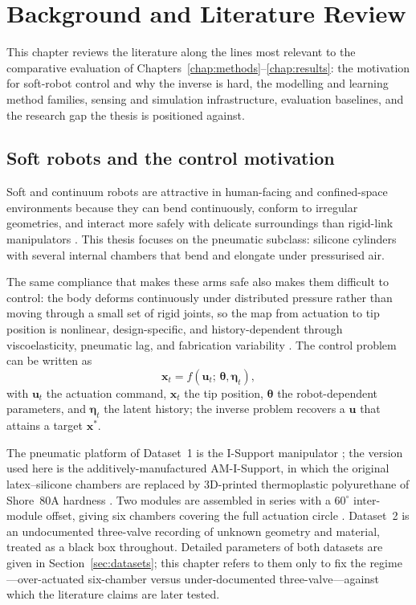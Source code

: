 \chapter{Background and Literature Review}
\label{chap:background}

This chapter reviews the literature along the lines most relevant to the comparative evaluation of Chapters~\ref{chap:methods}--\ref{chap:results}: the motivation for soft-robot control and why the inverse is hard, the modelling and learning method families, sensing and simulation infrastructure, evaluation baselines, and the research gap the thesis is positioned against.

\section{Soft robots and the control motivation}
\label{sec:bg_motivation}

Soft and continuum robots are attractive in human-facing and confined-space environments because they can bend continuously, conform to irregular geometries, and interact more safely with delicate surroundings than rigid-link manipulators \cite{rus2015softrobots, burgnerkahrs2015medical, dupont2022medical}. This thesis focuses on the pneumatic subclass: silicone cylinders with several internal chambers that bend and elongate under pressurised air.

The same compliance that makes these arms safe also makes them difficult to control: the body deforms continuously under distributed pressure rather than moving through a small set of rigid joints, so the map from actuation to tip position is nonlinear, design-specific, and history-dependent through viscoelasticity, pneumatic lag, and fabrication variability \cite{rus2015softrobots, thuruthel2018survey, kim2021mlsoft}. The control problem can be written as
\begin{equation}
  \mathbf{x}_{t} = f(\mathbf{u}_{t};\, \boldsymbol{\theta}, \boldsymbol{\eta}_{t}),
  \label{eq:bg_forward}
\end{equation}
with $\mathbf{u}_{t}$ the actuation command, $\mathbf{x}_{t}$ the tip position, $\boldsymbol{\theta}$ the robot-dependent parameters, and $\boldsymbol{\eta}_{t}$ the latent history; the inverse problem recovers a $\mathbf{u}$ that attains a target $\mathbf{x}^{\ast}$.

The pneumatic platform of Dataset~1 is the I-Support manipulator \cite{manti2016soft, ansari2017assistive, zlatintsi2020isupport}; the version used here is the additively-manufactured AM-I-Support, in which the original latex--silicone chambers are replaced by 3D-printed thermoplastic polyurethane of Shore~80A hardness \cite{centurelli2022closed, alessi2024pushing}. Two modules are assembled in series with a $60^{\circ}$ inter-module offset, giving six chambers covering the full actuation circle \cite{bianchi2024softoss}. Dataset~2 is an undocumented three-valve recording of unknown geometry and material, treated as a black box throughout. Detailed parameters of both datasets are given in Section~\ref{sec:datasets}; this chapter refers to them only to fix the regime---over-actuated six-chamber versus under-documented three-valve---against which the literature claims are later tested.

